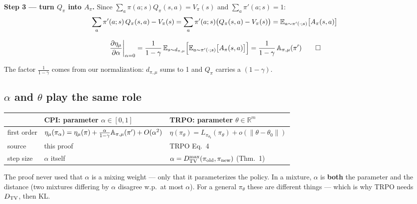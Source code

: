 \textbf{Step 3 --- turn $Q_\pi$ into $A_\pi$.} Since $\sum_a\pi(a;s)Q_\pi(s,a)=V_\pi(s)$ and $\sum_a\pi'(a;s)=1$:
\begin{gather*}
  \sum_a \pi'(a;s)\,Q_\pi(s,a) - V_\pi(s) = \sum_a\pi'(a;s)\big(Q_\pi(s,a)-V_\pi(s)\big) = \mathbb{E}_{a\sim\pi'(\cdot;s)}\big[A_\pi(s,a)\big]
\end{gather*}
\begin{eqbox}
\begin{gather*}
  \left.\frac{\partial\eta_\mu}{\partial\alpha}\right|_{\alpha=0}
  = \frac{1}{1-\gamma}\,\mathbb{E}_{s\sim d_{\pi,\mu}}\Big[\mathbb{E}_{a\sim\pi'(\cdot;s)}\big[A_\pi(s,a)\big]\Big]
  = \frac{1}{1-\gamma}\,\mathbb{A}_{\pi,\mu}(\pi') \qquad \square
\end{gather*}
\end{eqbox}
{\small The factor $\frac{1}{1-\gamma}$ comes from our normalization: $d_{\pi,\mu}$ sums to 1 and $Q_\pi$ carries a $(1-\gamma)$.}

\subsection*{$\alpha$ and $\theta$ play the same role}

\begin{center}
\small
\begin{tabular}{l l l}
\toprule
 & {\color{AtlasWarm}\textbf{CPI: parameter $\alpha\in[0,1]$}} & {\color{AtlasCool}\textbf{TRPO: parameter $\theta\in\mathbb R^m$}} \\
\midrule
first order & $\eta_\mu(\pi_\alpha)=\eta_\mu(\pi)+\frac{\alpha}{1-\gamma}\mathbb{A}_{\pi,\mu}(\pi')+O(\alpha^2)$ & $\eta(\pi_\theta)=L_{\pi_{\theta_0}}(\pi_\theta)+o(\|\theta-\theta_0\|)$ \\
source & this proof & TRPO Eq.~4 \\
step size & $\alpha$ itself & $\alpha=D_{\mathrm{TV}}^{\max}(\pi_{\mathrm{old}},\pi_{\mathrm{new}})$ (Thm.~1) \\
\bottomrule
\end{tabular}
\end{center}

\begin{keybox}
The proof never used that $\alpha$ is a mixing weight --- only that it parameterizes the policy. In a mixture, $\alpha$ is \textbf{both} the parameter and the distance (two mixtures differing by $\alpha$ disagree w.p.\ at most $\alpha$). For a general $\pi_\theta$ these are different things --- which is why TRPO needs $D_{\mathrm{TV}}$, then KL.
\end{keybox}


